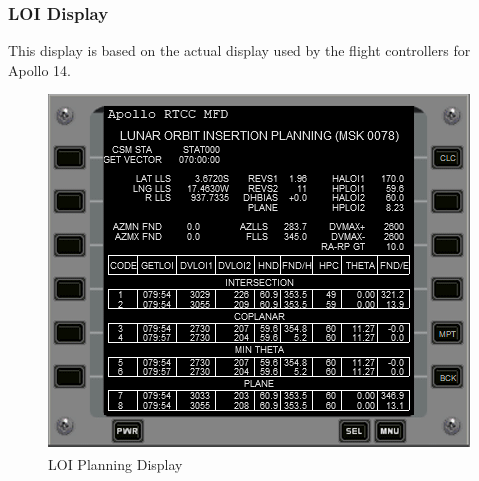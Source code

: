 \documentclass[11pt]{article} %
\begin{document}
\subsubsection{LOI Display}

This display is based on the actual display used by the flight controllers for Apollo 14.\\

\begin{figure}[hp]
	\centering
		\includegraphics{./ApolloRTCCMFDFiles/RTCCMFDLOIDisplayApollo14Example.png}
	\caption{LOI Planning Display}
	\label{fig:RTCCMFDLOIDisplayApollo14Example}
\end{figure}
\end{document}
